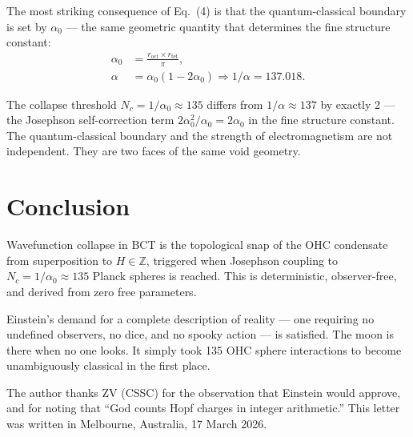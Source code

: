 \documentclass[aps,prl,twocolumn,superscriptaddress,showpacs]{revtex4-2}
\begin{document}
The most striking consequence of Eq.~(4) is that the quantum-classical 
boundary is set by $\alpha_0$ --- the same geometric quantity that 
determines the fine structure constant:
\begin{align}
\alpha_0 &= \frac{r_\mathrm{oct} \times r_\mathrm{tet}}{\pi}, \\
\alpha &= \alpha_0(1 - 2\alpha_0) \Rightarrow 1/\alpha = 137.018.
\end{align}

The collapse threshold $N_c = 1/\alpha_0 \approx 135$ differs from 
$1/\alpha \approx 137$ by exactly 2 --- the Josephson self-correction 
term $2\alpha_0^2/\alpha_0 = 2\alpha_0$ in the fine structure constant. 
The quantum-classical boundary and the strength of electromagnetism 
are not independent. They are two faces of the same void geometry.

\section{Conclusion}

Wavefunction collapse in BCT is the topological snap of the OHC 
condensate from superposition to $H \in \mathbb{Z}$, triggered when 
Josephson coupling to $N_c = 1/\alpha_0 \approx 135$ Planck spheres 
is reached. This is deterministic, observer-free, and derived from 
zero free parameters. 

Einstein's demand for a complete description of reality --- one 
requiring no undefined observers, no dice, and no spooky action --- 
is satisfied. The moon is there when no one looks. It simply took 
135 OHC sphere interactions to become unambiguously classical in 
the first place.

\begin{acknowledgments}
The author thanks ZV (CSSC) for the observation that Einstein would 
approve, and for noting that ``God counts Hopf charges in integer 
arithmetic.'' This letter was written in Melbourne, Australia, 
17 March 2026.
\end{acknowledgments}
\end{document}
